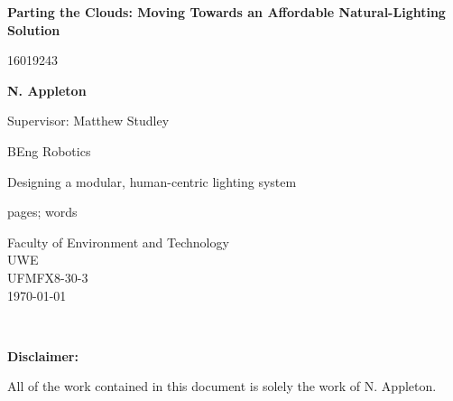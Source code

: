 \documentclass[twoside,twocolumn]{report}
\begin{document}

\begin{titlepage}

    \begin{center}
        \vspace*{1cm}
            
        \Huge
        \textbf{Parting the Clouds: Moving Towards an Affordable Natural-Lighting Solution}
            
        \vspace{0.5cm}
        \LARGE
        16019243
            
        \vspace{1.5cm}
            
        \textbf{N. Appleton}
        
        \vspace{0.5cm}
        Supervisor: Matthew Studley
        
        BEng Robotics
            
        \vfill
            
        Designing a modular, human-centric lighting system   
        
        \pageref{Lastpage} pages; 
        words
            
        \vspace{0.8cm}
            
        \Large
        Faculty of Environment and Technology\\
        UWE\\
        UFMFX8-30-3 \\
        \today
            
    \end{center}
\end{titlepage}


\begin{titlepage}
\centering
~
\vfill

\textbf{Disclaimer:}

All of the work contained in this document is solely the work of N. Appleton.

\vfill
~ \vfill
\end{titlepage}

\setcounter{tocdepth}{1	}
\tableofcontents 
\clearpage \newpage


\end{document}
